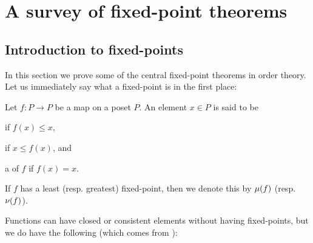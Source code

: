 












\section{A survey of fixed-point theorems}

\subsection{Introduction to fixed-points}\label{sec:fixed-point-intro}

In this section we prove some of the central fixed-point theorems in order theory. Let us immediately say what a fixed-point is in the first place:

\begin{definition}
    Let $f \colon P \to P$ be a map on a poset $P$. An element $x \in P$ is said to be
    \begin{enumdefinition}
        \item\label{enum:closed-element-definition}  if $f(x) \leq x$,
        \item\label{enum:consistent-element-definition}  if $x \leq f(x)$, and
        \item\label{enum:fixed-point-definition} a  of $f$ if $f(x) = x$.
    \end{enumdefinition}
    If $f$ has a least (resp. greatest) fixed-point, then we denote this by $\lfp{f}$ (resp. $\gfp{f}$).
\end{definition}
%
Functions can have closed or consistent elements without having fixed-points, but we do have the following (which comes from \cite[§10.1]{gunter-semantics}):


